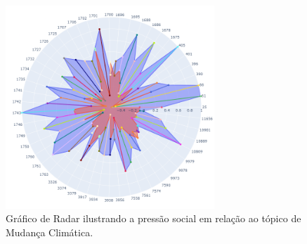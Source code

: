 \begin{figure}[htb]
	\centering
	\includegraphics[width=0.7\textwidth]{images/social_barometer_weather.png}
	\caption{Gráfico de Radar ilustrando a pressão social em relação ao tópico de Mudança Climática.}
	\label{fig:social_barometer_weather}
\end{figure}

